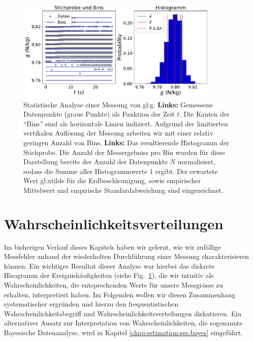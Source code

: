 \begin{figure}[H]
\centering
\includegraphics[width=0.9\textwidth]{Figures/messfehler1.pdf}
\caption{Statistische Analyse einer Messung von \gls{gl:g}. \textbf{Links:} Gemessene Datenpunkte (graue Punkte) als Funktion der Zeit $t$. Die Kanten der ``Bins'' sind als horizontale Linien indiziert. Aufgrund der limitierten vertikalen Auflösung der Messung arbeiten wir mit einer relativ geringen Anzahl von Bins.  \textbf{Links:} Das resultierende Histogramm der Stichprobe. Die Anzahl der Messergebniss pro Bin wurden für diese Darstellung bereits der Anzahl der Datenpunkte $N$ normalisiert, sodass die Summe aller Histogrammwerte 1 ergibt. Der erwartete Wert \gls{gl:xtilde} für die Erdbeschleunigung, sowie empirischer Mittelwert und empirische Standardabweichung sind eingezeichnet. }
\label{fig:messfehler1}
\end{figure}

\section{Wahrscheinlichkeitsverteilungen}
\label{chap:fehler:sec:frequentistisch}

Im bisherigen Verlauf dieses Kapitels haben wir gelernt, wie wir zufällige Messfehler anhand der wiederholten Durchführung einer Messung charakterisieren können. Ein wichtiges Resultat dieser Analyse war hierbei das diskrete Hisogramm der Ereignishäufigkeiten (siehe Fig.~\ref{fig:messfehler1}), die wir intuitiv als Wahrscheinlichkeiten, die entsprechenden Werte für unsere Messgrösse zu erhalten, interpretiert haben.  Im Folgenden wollen wir diesen Zusammenhang systematischer ergründen und hierzu den frequentistischen Wahrscheinlichkeitsbegriff und Wahrscheinlichkeitsverteilungen diskutieren.  Ein alternativer Ansatz zur Interpretation von Wahrscheinlichkeiten, die sogenannte Bayesische Datenanalyse, wird in Kapitel \ref{chap:estimation:sec:bayes} eingeführt. 

